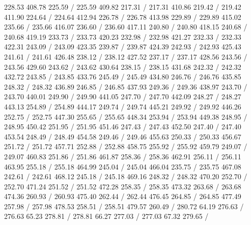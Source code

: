 { 228.53 408.78 225.59 /
 225.59 409.82 217.31 /
 217.31 410.86 219.42 /
 219.42 411.90 224.64 /
 224.64 412.94 226.78 /
 226.78 413.98 229.89 /
 229.89 415.02 235.66 /
 235.66 416.07 236.60 /
 236.60 417.11 240.80 /
 240.80 418.15 240.68 /
 240.68 419.19 233.73 /
 233.73 420.23 232.98 /
 232.98 421.27 232.33 /
 232.33 422.31 243.09 /
 243.09 423.35 239.87 /
 239.87 424.39 242.93 /
 242.93 425.43 241.61 /
 241.61 426.48 238.12 /
 238.12 427.52 237.17 /
 237.17 428.56 243.56 /
 243.56 429.60 243.62 /
 243.62 430.64 238.15 /
 238.15 431.68 242.32 /
 242.32 432.72 243.85 /
 243.85 433.76 245.49 /
 245.49 434.80 246.76 /
 246.76 435.85 248.32 /
 248.32 436.89 246.85 /
 246.85 437.93 249.36 /
 249.36 438.97 243.70 /
 243.70 440.01 249.90 /
 249.90 441.05 247.70 /
 247.70 442.09 248.27 /
 248.27 443.13 254.89 /
 254.89 444.17 249.74 /
 249.74 445.21 249.92 /
 249.92 446.26 252.75 /
 252.75 447.30 255.65 /
 255.65 448.34 253.94 /
 253.94 449.38 248.95 /
 248.95 450.42 251.95 /
 251.95 451.46 247.43 /
 247.43 452.50 247.40 /
 247.40 453.54 248.49 /
 248.49 454.58 249.46 /
 249.46 455.63 250.33 /
 250.33 456.67 251.72 /
 251.72 457.71 252.88 /
 252.88 458.75 255.92 /
 255.92 459.79 249.07 /
 249.07 460.83 251.86 /
 251.86 461.87 258.36 /
 258.36 462.91 256.11 /
 256.11 463.95 255.18 /
 255.18 464.99 245.04 /
 245.04 466.04 235.75 /
 235.75 467.08 242.61 /
 242.61 468.12 245.18 /
 245.18 469.16 248.32 /
 248.32 470.20 252.70 /
 252.70 471.24 251.52 /
 251.52 472.28 258.35 /
 258.35 473.32 263.68 /
 263.68 474.36 260.93 /
 260.93 475.40 262.44 /
 262.44 476.45 264.85 /
 264.85 477.49 257.98 /
 257.98 478.53 258.51 /
 258.51 479.57 260.49 /
\setsolid
{} 280.72 64.19 276.63 /
 276.63 65.23 278.81 /
 278.81 66.27 277.03 /
 277.03 67.32 279.65 /
}
